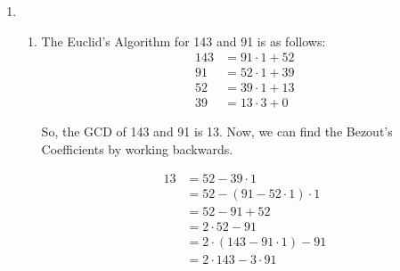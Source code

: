 \documentclass[a4paper]{article}
\begin{document}
\begin{enumerate}
        \item \begin{enumerate}
            \item The Euclid's Algorithm for 143 and 91 is as follows:
            \[
                \begin{split}
                    143 &= 91 \cdot 1 + 52 \\
                    91 &= 52 \cdot 1 + 39 \\
                    52 &= 39 \cdot 1 + 13 \\
                    39 &= 13 \cdot 3 + 0
                \end{split}    
            \]

            So, the GCD of 143 and 91 is 13. Now, we can find the Bezout's Coefficients by working backwards.

            \[
                \begin{split}
                    13 &= 52 - 39 \cdot 1 \\
                    &= 52 - (91 - 52 \cdot 1) \cdot 1 \\
                    &= 52 - 91 + 52 \\
                    &= 2 \cdot 52 - 91 \\
                    &= 2 \cdot (143 - 91 \cdot 1) - 91 \\
                    &= 2 \cdot 143 - 3 \cdot 91
                \end{split}
            \]


\end{enumerate}
\end{enumerate}
\end{document}
